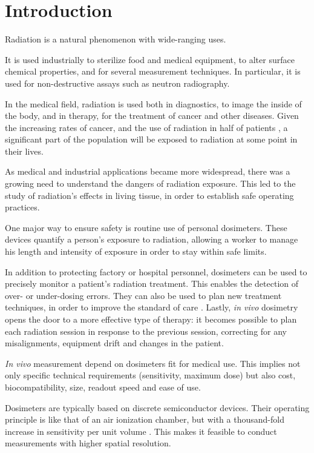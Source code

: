 \section{Introduction}
Radiation is a natural phenomenon with wide-ranging uses.

It is used industrially to sterilize food and medical equipment,
to alter surface chemical properties\cite{clough2001high},
and for several measurement techniques.
In particular, it is used for non-destructive assays such as
neutron radiography\cite{berger_neutron_1960}.

In the medical field, radiation is used both in diagnostics,
to image the inside of the body,
and in therapy, for the treatment of cancer and other diseases.
Given the increasing rates of cancer,
and the use of radiation in half of patients
\cite{symposium_assurance_dosimetry_1994},
a significant part of the population will be exposed to radiation
at some point in their lives.

As medical and industrial applications became more widespread,
there was a growing need to understand the dangers of radiation exposure.
This led to the study of radiation's effects in living tissue,
in order to establish safe operating practices.

One major way to ensure safety is routine use of personal dosimeters.
These devices quantify a person's exposure to radiation,
allowing a worker to manage his length and intensity of exposure
in order to stay within safe limits.

In addition to protecting factory or hospital personnel,
dosimeters can be used to precisely monitor a patient's radiation treatment.
This enables the detection of over- or under-dosing errors\cite{noel_detection_1995}.
They can also be used to plan new treatment techniques,
in order to improve the standard of care
\cite{essers_vivo_1999}.
Lastly, \emph{in vivo} dosimetry
opens the door to a more effective type of therapy:
it becomes possible to plan each radiation session
in response to the previous session,
correcting for any misalignments,
equipment drift and changes in the patient\cite{wu_application_2006}.

\emph{In vivo} measurement depend on dosimeters fit for medical use.
This implies not only specific technical requirements
(sensitivity, maximum dose)
but also cost, biocompatibility, size, readout speed and ease of use.

Dosimeters are typically based on discrete semiconductor devices.
Their operating principle is like that of an air ionization chamber,
but with a thousand-fold increase in sensitivity per unit volume
\cite{jones_application_1963}.
This makes it feasible to conduct measurements with higher spatial resolution.

